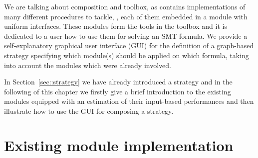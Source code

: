 We are talking about composition and toolbox, as \smtrat contains implementations
of many different procedures to tackle, \eg \supportedLogics, each of them
embedded in a module with uniform interfaces. These modules form the tools in the toolbox
and it is dedicated to a user how to use them for solving an SMT formula.
We provide a self-explanatory graphical user interface (GUI) for the definition of a graph-based 
strategy specifying which module(s) should be applied on which formula, 
taking into account the modules which were already involved.

In Section~\ref{sec::strategy} we have already introduced
a strategy and in the following of this chapter we firstly give a brief introduction 
to the existing modules equipped with an estimation of their input-based performances and then illustrate
how to use the GUI for composing a strategy.

\section{Existing module implementation}
